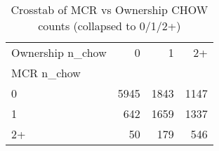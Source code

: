 \begin{table}
\caption{Crosstab of MCR vs Ownership CHOW counts (collapsed to 0/1/2+)}
\label{tab:chow_agreement_crosstab}
\begin{tabular}{lrrr}
\toprule
Ownership n_chow & 0 & 1 & 2+ \\
MCR n_chow &  &  &  \\
\midrule
0 & 5945 & 1843 & 1147 \\
1 & 642 & 1659 & 1337 \\
2+ & 50 & 179 & 546 \\
\bottomrule
\end{tabular}
\end{table}
